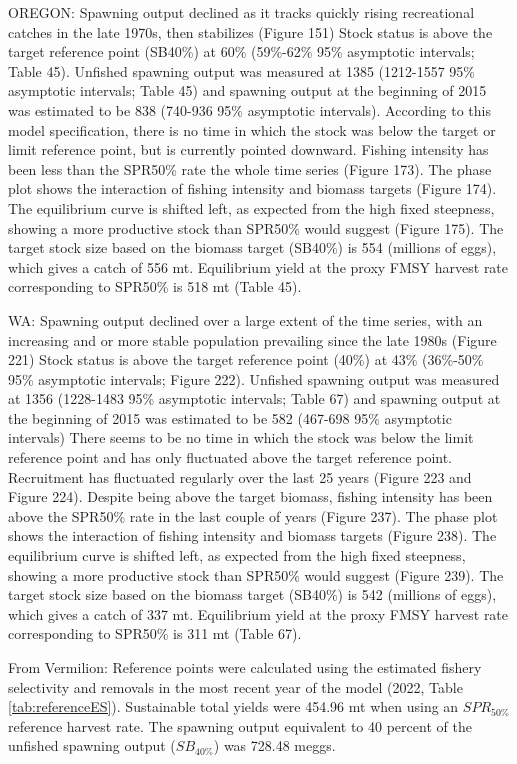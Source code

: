 \documentclass[11pt,
  english,
  letterpaper,
]{article}
\begin{document}
OREGON: Spawning output declined as it tracks quickly rising recreational catches in the late 1970s, then stabilizes (Figure 151) Stock status is above the target reference point (SB40\%) at 60\% (59\%-62\% 95\% asymptotic intervals; Table 45). Unfished spawning output was measured at 1385 (1212-1557 95\% asymptotic intervals; Table 45) and spawning output at the beginning of 2015 was estimated to be 838 (740-936 95\% asymptotic intervals). According to this model specification, there is no time in which the stock was below the target or limit reference point, but is currently pointed downward. Fishing intensity has been less than the SPR50\% rate the whole time series (Figure 173). The phase plot shows the interaction of fishing intensity and biomass targets (Figure 174). The equilibrium curve is shifted left, as expected from the high fixed steepness, showing a more productive stock than SPR50\% would suggest (Figure 175). The target stock size based on the biomass target (SB40\%) is 554 (millions of eggs), which gives a catch of 556 mt. Equilibrium yield at the proxy FMSY harvest rate corresponding to SPR50\% is 518 mt (Table 45).

WA: Spawning output declined over a large extent of the time series, with an increasing and or more stable population prevailing since the late 1980s (Figure 221) Stock status is above the target reference point (40\%) at 43\% (36\%-50\% 95\% asymptotic intervals; Figure 222). Unfished spawning output was measured at 1356 (1228-1483 95\% asymptotic intervals; Table 67) and spawning output at the beginning of 2015 was estimated to be 582 (467-698 95\% asymptotic intervals) There seems to be no time in which the stock was below the limit reference point and has only fluctuated above the target reference point. Recruitment has fluctuated regularly over the last 25 years (Figure 223 and Figure 224). Despite being above the target biomass, fishing intensity has been above the SPR50\% rate in the last couple of years (Figure 237). The phase plot shows the interaction of fishing intensity and biomass targets (Figure 238). The equilibrium curve is shifted left, as expected from the high fixed steepness, showing a more productive stock than SPR50\% would suggest (Figure 239). The target stock size based on the biomass target (SB40\%) is 542 (millions of eggs), which gives a catch of 337 mt. Equilibrium yield at the proxy FMSY harvest rate corresponding to SPR50\% is 311 mt (Table 67).

From Vermilion: Reference points were calculated using the estimated fishery selectivity and removals in the most recent year of the model (2022, Table \ref{tab:referenceES}). Sustainable total yields were 454.96 mt when using an \(SPR_{50\%}\) reference harvest rate. The spawning output equivalent to 40 percent of the unfished spawning output (\(SB_{40\%}\)) was 728.48 meggs.
\end{document}
